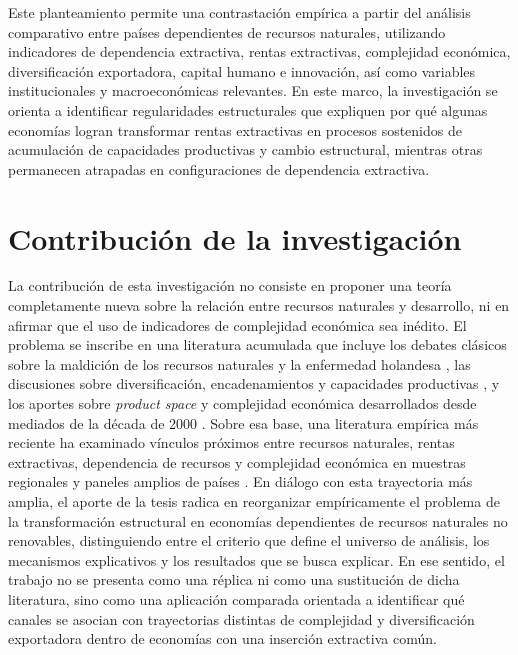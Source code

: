 \documentclass[../../PTFM.tex]{subfiles}
\begin{document}
	Este planteamiento permite una contrastación empírica a partir del análisis comparativo entre países dependientes de recursos naturales, utilizando indicadores de dependencia extractiva, rentas extractivas, complejidad económica, diversificación exportadora, capital humano e innovación, así como variables institucionales y macroeconómicas relevantes. En este marco, la investigación se orienta a identificar regularidades estructurales que expliquen por qué algunas economías logran transformar rentas extractivas en procesos sostenidos de acumulación de capacidades productivas y cambio estructural, mientras otras permanecen atrapadas en configuraciones de dependencia extractiva.

	\chapter{Contribución de la investigación}
	\label{chap:contribucion}

	La contribución de esta investigación no consiste en proponer una teoría completamente nueva sobre la relación entre recursos naturales y desarrollo, ni en afirmar que el uso de indicadores de complejidad económica sea inédito. El problema se inscribe en una literatura acumulada que incluye los debates clásicos sobre la maldición de los recursos naturales y la enfermedad holandesa \parencite{Auty1993,Corden1982,Sachs1995,Sachs2001}, las discusiones sobre diversificación, encadenamientos y capacidades productivas \parencite{Hirschman1958,Agosin2012,Harding2016}, y los aportes sobre \textit{product space} y complejidad económica desarrollados desde mediados de la década de 2000 \parencite{Hausmann2007,Hidalgo2009,Hausmann2014}. Sobre esa base, una literatura empírica más reciente ha examinado vínculos próximos entre recursos naturales, rentas extractivas, dependencia de recursos y complejidad económica en muestras regionales y paneles amplios de países \parencite{Ajide2022,Avom2022,Canh2020,Destek2023,Kelly2024,Owjimehr2024,Zhang2023}. En diálogo con esta trayectoria más amplia, el aporte de la tesis radica en reorganizar empíricamente el problema de la transformación estructural en economías dependientes de recursos naturales no renovables, distinguiendo entre el criterio que define el universo de análisis, los mecanismos explicativos y los resultados que se busca explicar. En ese sentido, el trabajo no se presenta como una réplica ni como una sustitución de dicha literatura, sino como una aplicación comparada orientada a identificar qué canales se asocian con trayectorias distintas de complejidad y diversificación exportadora dentro de economías con una inserción extractiva común.
\end{document}
